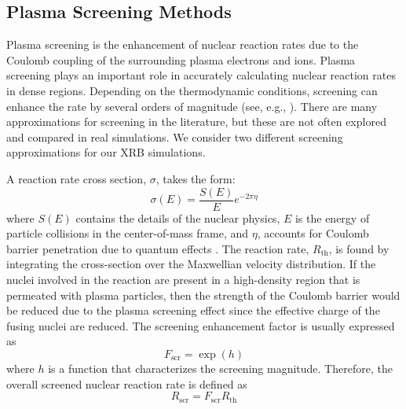 \documentclass[preprint,times,tighten]{aastex631}
\begin{document}


\subsection{Plasma Screening Methods}\label{Sec:screening}

Plasma screening is the enhancement of nuclear reaction rates due to the Coulomb coupling of the surrounding plasma electrons and ions. Plasma screening plays an important role in accurately calculating nuclear reaction rates in dense regions.
Depending on the thermodynamic conditions, 
screening can enhance the rate by several orders
of magnitude (see, e.g., \citealt{woosley-ignition}).
There are many approximations for screening in the literature, but these are not
often explored and compared in real simulations.
We consider two different screening approximations
for our XRB simulations.

A reaction rate cross section, $\sigma$, takes the form:
\begin{equation}
    \sigma(E) = \frac{S(E)}{E} e^{-2\pi \eta}
\end{equation}
where $S(E)$ contains the details of the nuclear physics, $E$ is the energy of particle collisions in the center-of-mass frame, and $\eta$, accounts for Coulomb barrier penetration due to quantum effects \citep{Newton2007}. The reaction rate, $R_{\textrm{th}}$, is found by integrating the cross-section over the Maxwellian velocity distribution.  If the nuclei involved in the reaction are present in a high-density region that is permeated with plasma particles, then the strength of the Coulomb barrier would be reduced due to the plasma screening effect since the effective charge of the fusing nuclei are reduced. The screening enhancement factor is usually expressed as
\begin{equation}
    F_{\textrm{scr}} = \exp{(h)}
\end{equation}
where $h$ is a function that characterizes the screening magnitude. Therefore, the overall screened nuclear reaction rate is defined as
\begin{equation}\label{Eq:screened_rate}
    R_{\textrm{scr}} = F_{\textrm{scr}}R_{\textrm{th}}
\end{equation}
\end{document}
